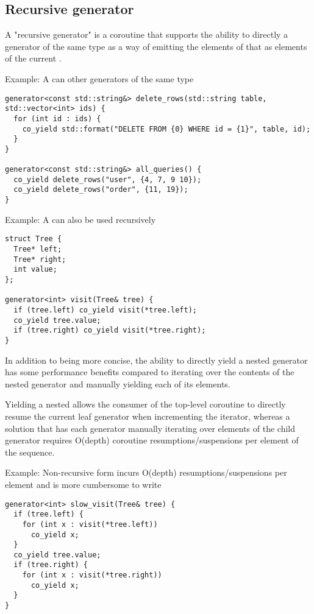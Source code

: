 \documentclass{wg21}
\begin{document}
\subsection{Recursive generator}

A "recursive generator" is a coroutine that supports the ability to directly 
a generator of the same type as a way of emitting the elements of that 
as elements of the current .

Example: A  can  other generators of the same type
\begin{lstlisting}[style=color]
generator<const std::string&> delete_rows(std::string table, std::vector<int> ids) {
  for (int id : ids) {
    co_yield std::format("DELETE FROM {0} WHERE id = {1}", table, id);
  }
}

generator<const std::string&> all_queries() {
  co_yield delete_rows("user", {4, 7, 9 10});
  co_yield delete_rows("order", {11, 19});
}
\end{lstlisting}

Example: A  can also be used recursively
\begin{lstlisting}[style=color]
struct Tree {
  Tree* left;
  Tree* right;
  int value;
};

generator<int> visit(Tree& tree) {
  if (tree.left) co_yield visit(*tree.left);
  co_yield tree.value;
  if (tree.right) co_yield visit(*tree.right);
}
\end{lstlisting}

In addition to being more concise, the ability to directly yield a nested generator has some
performance benefits compared to iterating over the contents of the nested generator and
manually yielding each of its elements.

Yielding a nested  allows the consumer of the top-level coroutine to
directly resume the current leaf generator when incrementing the iterator, whereas a solution that has each generator manually iterating over elements of the child generator
requires O(depth) coroutine resumptions/suspensions per element of the sequence.

Example: Non-recursive form incurs O(depth) resumptions/suspensions per element
and is more cumbersome to write
\begin{lstlisting}[style=color]
generator<int> slow_visit(Tree& tree) {
  if (tree.left) {
    for (int x : visit(*tree.left))
      co_yield x;
  }
  co_yield tree.value;
  if (tree.right) {
    for (int x : visit(*tree.right))
      co_yield x;
  }
}
\end{lstlisting}
\end{document}
